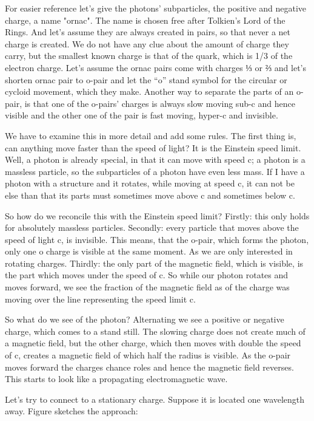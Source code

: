 For easier reference let's give the photons'  subparticles, the positive and negative charge, a name "ornac". The name is chosen free after Tolkien's Lord of the Rings.
And let's assume they are always created in pairs, so that never a net charge is created. We do not have any clue about the amount of charge they carry, but the smallest known charge is that of the quark, which is  1/3 of the electron charge. Let's assume the ornac pairs come with charges ⅓ or  ⅔ and let's shorten ornac pair to o-pair and let the “o” stand symbol for the  circular or cycloid movement, which they make. Another way to separate the parts of an o-pair, is that one of the o-pairs’ charges is always slow moving sub-c and hence visible and the other one of the pair is fast moving, hyper-c and invisible.

We have to examine this in more detail and add some rules. The first thing is, can anything move faster than the speed of light? It is the Einstein speed limit.
Well, a photon is already special, in that it can move with speed c; a photon is a massless particle, so the subparticles of a photon have even less mass. 
If I have a photon with a structure and it rotates, while moving at speed c, it can not be else than that its parts must sometimes move above c and sometimes below c.

So how do we reconcile this with the Einstein speed limit? Firstly: this only holds for absolutely massless particles.
Secondly: every particle that moves above the speed of light c, is invisible. This means, that the o-pair, which forms the photon, only one o charge is visible at the same moment.
As we are only interested in rotating charges. Thirdly: the only part of the magnetic field, which is visible, is the part which moves under the speed of c. So while our photon rotates and moves forward, we see the fraction of the magnetic field as of the charge was moving over the line representing the speed limit c.

So what do we see of the photon? Alternating we see a positive or negative charge, which comes to a stand still. The slowing charge does not create much of a magnetic field, but the other charge, which then moves with double the speed of c, creates a magnetic field of which half the radius is visible.
As the o-pair moves forward the charges chance roles and hence the magnetic field reverses. This starts to look like a propagating electromagnetic wave.

Let's try to connect to a stationary charge. Suppose it is located one wavelength away. Figure sketches the approach:

